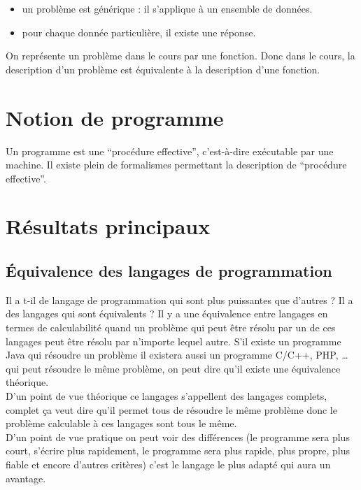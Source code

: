 \begin{itemize}
	\item un problème est générique : il s'applique à un ensemble de données.
	\item pour chaque donnée particulière, il existe une réponse.
\end{itemize}
On représente un problème dans le cours par une fonction. Donc dans le cours,
la description d'un problème est équivalente à la description d'une fonction.

\section{Notion de programme}
\label{ssub:notion_de_programme}

Un programme est une ``procédure effective'', c'est-à-dire exécutable par une machine.
Il existe plein de formalismes permettant la description de ``procédure effective''.


\section{Résultats principaux}
\label{sub:r_sultat_principaux}

	\subsection{ Équivalence des langages de programmation}
	 Il a t-il de langage de programmation qui sont plus puissantes que d'autres ?  Il a des langages qui sont équivalents ? 
	\newline Il y a une équivalence entre langages en termes de calculabilité quand un problème qui peut être résolu par un de ces langages peut être résolu par n'importe lequel autre.   
S'il existe un programme Java qui résoudre un problème il existera aussi un programme C/C++, PHP, … qui peut résoudre le même problème, on peut dire qu'il existe une équivalence théorique.\\
 D'un point de vue théorique ce langages s'appellent des langages complets, complet ça veut dire qu'il permet tous de résoudre le même problème donc le problème calculable à ces langages sont tous le même.\\
D'un point de vue pratique on peut voir des différences (le programme sera plus court, s'écrire plus rapidement, le programme sera plus rapide, plus propre, plus fiable et encore d'autres critères) c'est le langage le plus adapté qui aura un avantage. 



